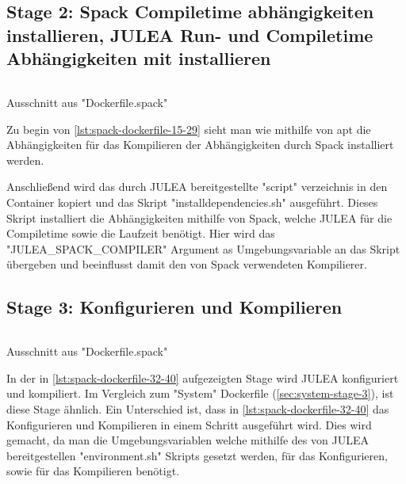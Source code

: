 \subsection{Stage 2: Spack Compiletime abhängigkeiten installieren, JULEA Run- und Compiletime Abhängigkeiten mit installieren}

\begin{listing}[H]
    \inputminted[firstline=15,lastline=29]{dockerfile}{./code-examples/Dockerfile.spack}
    \caption{Ausschnitt aus "Dockerfile.spack"}
    \label{lst:spack-dockerfile-15-29}
\end{listing}

Zu begin von \cref{lst:spack-dockerfile-15-29} sieht man wie mithilfe von apt die Abhängigkeiten für das Kompilieren der Abhängigkeiten durch Spack installiert werden. 

Anschließend wird das durch JULEA bereitgestellte "script" verzeichnis in den Container kopiert und das Skript "install\-dependencies.sh" ausgeführt. Dieses Skript installiert die Abhängigkeiten mithilfe von Spack, welche JULEA für die Compiletime sowie die Laufzeit benötigt. Hier wird das "JULEA\_SPACK\_COMPILER" Argument as Umgebungsvariable an das Skript übergeben und beeinflusst damit den von Spack verwendeten Kompilierer.


\subsection{Stage 3: Konfigurieren und Kompilieren} \label{sec:spack-stage-3}

\begin{listing}[H]
    \inputminted[firstline=32,lastline=40]{dockerfile}{./code-examples/Dockerfile.spack}
    \caption{Ausschnitt aus "Dockerfile.spack"}
    \label{lst:spack-dockerfile-32-40}
\end{listing}

In der in \cref{lst:spack-dockerfile-32-40} aufgezeigten Stage wird JULEA konfiguriert und kompiliert. Im Vergleich zum "System" Dockerfile (\cref{sec:system-stage-3}), ist diese Stage ähnlich. Ein Unterschied ist, dass in \cref{lst:spack-dockerfile-32-40} das Konfigurieren und Kompilieren in einem Schritt ausgeführt wird. Dies wird gemacht, da man die Umgebungsvariablen welche mithilfe des von JULEA bereitgestellen "environment.sh" Skripts gesetzt werden, für das Konfigurieren, sowie für das Kompilieren benötigt. 

